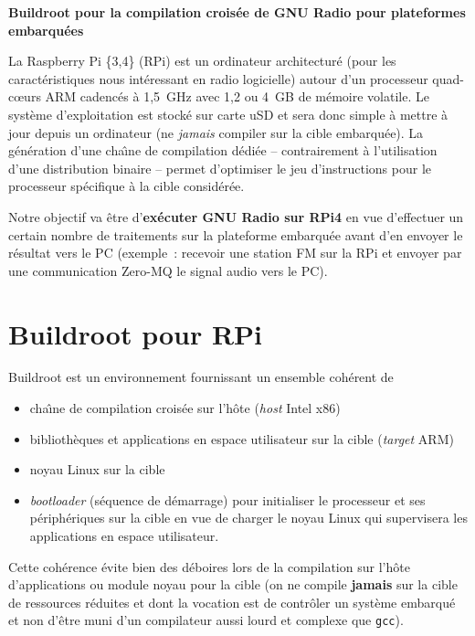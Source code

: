 \documentclass[a4paper]{article}
\begin{document}
\begin{center}
{\bf\Large Buildroot pour la compilation crois\'ee de GNU Radio pour plateformes 
embarqu\'ees}
\end{center}

La Raspberry Pi \{3,4\} (RPi) est un ordinateur architectur\'e (pour les
caract\'eristiques nous int\'eressant en radio logicielle) autour
d'un processeur quad-c\oe urs ARM cadenc\'es \`a 1,5~GHz avec 1,2 ou 4~GB
de m\'emoire volatile. Le syst\`eme d'exploitation est stock\'e sur
carte uSD et sera donc simple \`a mettre \`a jour depuis un ordinateur (ne 
{\em jamais} compiler sur la cible embarqu\'ee). La g\'en\'eration d'une cha\^\i ne
de compilation d\'edi\'ee -- contrairement \`a l'utilisation d'une distribution
binaire -- permet d'optimiser le jeu d'instructions pour le processeur sp\'ecifique
\`a la cible consid\'er\'ee.

Notre objectif va \^etre d'{\bf ex\'ecuter GNU Radio sur RPi4} en vue d'effectuer
un certain nombre de traitements sur la plateforme embarqu\'ee avant d'en envoyer
le r\'esultat vers le PC (exemple~: recevoir une station FM sur la RPi et envoyer
par une communication Zero-MQ le signal audio vers le PC).

\section{Buildroot pour RPi}

Buildroot est un environnement fournissant un ensemble coh\'erent de
\begin{itemize}
\item cha\^\i ne de compilation crois\'ee sur l'h\^ote ({\em host} Intel x86)
\item biblioth\`eques et applications en espace utilisateur sur la cible ({\em target} ARM)
\item noyau Linux sur la cible
\item {\em bootloader} (s\'equence de d\'emarrage) pour initialiser le processeur et
ses p\'eriph\'eriques sur la cible en vue de charger le noyau Linux qui supervisera les
applications en espace utilisateur.
\end{itemize}

Cette coh\'erence \'evite bien des d\'eboires lors de la compilation sur l'h\^ote d'applications
ou module noyau pour la cible (on ne compile {\bf jamais} sur la cible de ressources r\'eduites
et dont la vocation est de contr\^oler un syst\`eme embarqu\'e et non d'\^etre muni d'un compilateur
aussi lourd et complexe que {\tt gcc}).
\end{document}

